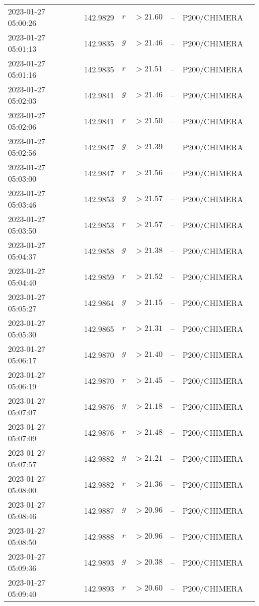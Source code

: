 \documentclass{nature_plusfigure}
\begin{document}
\begin{supplement}
\begin{center}
\begin{longtable}{lllllll}
2023-01-27 05:00:26 & 142.9829 & $r$ & $>21.60$ & -- & P200/CHIMERA &  \\ 
2023-01-27 05:01:13 & 142.9835 & $g$ & $>21.46$ & -- & P200/CHIMERA &  \\ 
2023-01-27 05:01:16 & 142.9835 & $r$ & $>21.51$ & -- & P200/CHIMERA &  \\ 
2023-01-27 05:02:03 & 142.9841 & $g$ & $>21.46$ & -- & P200/CHIMERA &  \\ 
2023-01-27 05:02:06 & 142.9841 & $r$ & $>21.50$ & -- & P200/CHIMERA &  \\ 
2023-01-27 05:02:56 & 142.9847 & $g$ & $>21.39$ & -- & P200/CHIMERA &  \\ 
2023-01-27 05:03:00 & 142.9847 & $r$ & $>21.56$ & -- & P200/CHIMERA &  \\ 
2023-01-27 05:03:46 & 142.9853 & $g$ & $>21.57$ & -- & P200/CHIMERA &  \\ 
2023-01-27 05:03:50 & 142.9853 & $r$ & $>21.57$ & -- & P200/CHIMERA &  \\ 
2023-01-27 05:04:37 & 142.9858 & $g$ & $>21.38$ & -- & P200/CHIMERA &  \\ 
2023-01-27 05:04:40 & 142.9859 & $r$ & $>21.52$ & -- & P200/CHIMERA &  \\ 
2023-01-27 05:05:27 & 142.9864 & $g$ & $>21.15$ & -- & P200/CHIMERA &  \\ 
2023-01-27 05:05:30 & 142.9865 & $r$ & $>21.31$ & -- & P200/CHIMERA &  \\ 
2023-01-27 05:06:17 & 142.9870 & $g$ & $>21.40$ & -- & P200/CHIMERA &  \\ 
2023-01-27 05:06:19 & 142.9870 & $r$ & $>21.45$ & -- & P200/CHIMERA &  \\ 
2023-01-27 05:07:07 & 142.9876 & $g$ & $>21.18$ & -- & P200/CHIMERA &  \\ 
2023-01-27 05:07:09 & 142.9876 & $r$ & $>21.48$ & -- & P200/CHIMERA &  \\ 
2023-01-27 05:07:57 & 142.9882 & $g$ & $>21.21$ & -- & P200/CHIMERA &  \\ 
2023-01-27 05:08:00 & 142.9882 & $r$ & $>21.36$ & -- & P200/CHIMERA &  \\ 
2023-01-27 05:08:46 & 142.9887 & $g$ & $>20.96$ & -- & P200/CHIMERA &  \\ 
2023-01-27 05:08:50 & 142.9888 & $r$ & $>20.96$ & -- & P200/CHIMERA &  \\ 
2023-01-27 05:09:36 & 142.9893 & $g$ & $>20.38$ & -- & P200/CHIMERA &  \\ 
2023-01-27 05:09:40 & 142.9893 & $r$ & $>20.60$ & -- & P200/CHIMERA &  \\ 

\end{longtable}
\end{center}
\end{supplement}
\end{document}
